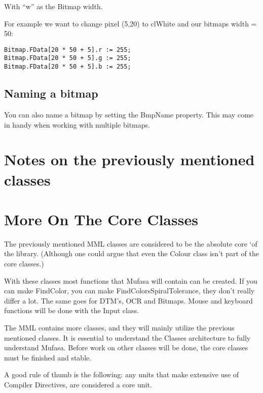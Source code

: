 \documentclass[a4paper, 10pt]{report} %
\begin{document}
With ``w'' as the Bitmap width.

For example we want to change pixel (5,20) to clWhite and our bitmaps
width = 50:
\begin{verbatim}
Bitmap.FData[20 * 50 + 5].r := 255;
Bitmap.FData[20 * 50 + 5].g := 255;
Bitmap.FData[20 * 50 + 5].b := 255;
\end{verbatim}

\subsection{Naming a bitmap}
You can also name a bitmap by setting the BmpName property.
This may come in handy when working with multiple bitmaps.

\section{Notes on the previously mentioned classes}


\section{More On The Core Classes}

The previously mentioned MML classes are considered to be the absolute core 
`of the library. (Although one could argue that even the Colour class isn't
part of the core classes.)

With these classes most functions that Mufasa will contain can be created.
If you can make FindColor, you can make FindColorsSpiralTolerance, 
they don't really differ a lot. The same goes for DTM's, OCR and Bitmaps.
Mouse and keyboard functions will be done with the Input class.

The MML contains more classes, and they will mainly utilize the previous
mentioned classes. It is essential to understand the Classes architecture
to fully understand Mufasa. Before work on other classes will be done,
the core classes must be finished and stable.

A good rule of thumb is the following: any units that make extensive use of
Compiler Directives, are considered a core unit.
\end{document}
